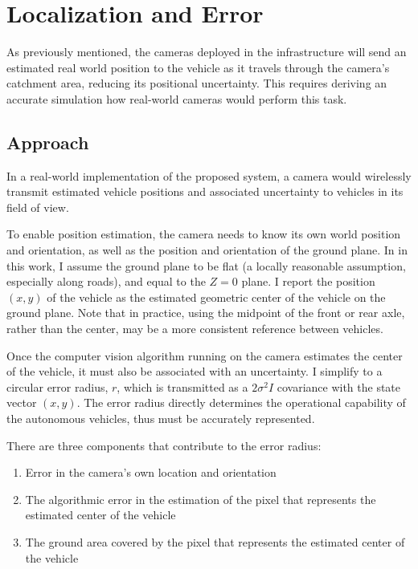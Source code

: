 \documentclass[a4paper,12pt,twoside,openright]{report}
\begin{document}
 
\section{Localization and Error}

As previously mentioned, the cameras deployed in the infrastructure will
send an estimated real world position to the vehicle as it travels through the 
camera's catchment area, reducing its positional uncertainty. This requires
deriving an accurate simulation how real-world cameras would perform this task.

\subsection{Approach}

In a real-world implementation of the proposed system, a camera would wirelessly
transmit estimated vehicle positions and associated uncertainty to vehicles in its field of view.

To enable position estimation, the camera needs to know its own world position and orientation, 
as well as the position and orientation of the ground plane. In in this work,
I assume the ground plane to be flat (a locally reasonable assumption, especially along roads), 
and equal to the $Z = 0$ plane. I report the position $(x,y)$ of the vehicle
as the estimated geometric center of the vehicle on the ground plane. 
Note that in practice, using the midpoint of the front or rear axle, rather than the center, 
may be a more consistent reference between vehicles.

Once the computer vision algorithm running on the camera estimates the center of the vehicle,
it must also be associated with an uncertainty. I simplify to a circular
error radius, $r$, which is transmitted as a $2\sigma^2I$ covariance 
with the state vector $(x,y)$. The error radius directly determines
the operational capability of the autonomous vehicles, thus must be
accurately represented.

There are three components that contribute to the error radius:
\begin{enumerate}
    \item Error in the camera's own location and orientation
    \item The algorithmic error in the estimation of the pixel that represents the estimated center of the vehicle
    \item The ground area covered by the pixel that represents the estimated center of the vehicle
\end{enumerate}
 
\end{document}
